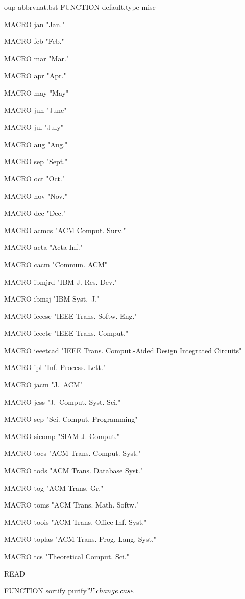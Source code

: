 \begin{filecontents*}[overwrite]{oup-abbrvnat.bst}
FUNCTION {default.type} { misc }


MACRO {jan} {"Jan."}

MACRO {feb} {"Feb."}

MACRO {mar} {"Mar."}

MACRO {apr} {"Apr."}

MACRO {may} {"May"}

MACRO {jun} {"June"}

MACRO {jul} {"July"}

MACRO {aug} {"Aug."}

MACRO {sep} {"Sept."}

MACRO {oct} {"Oct."}

MACRO {nov} {"Nov."}

MACRO {dec} {"Dec."}



MACRO {acmcs} {"ACM Comput. Surv."}

MACRO {acta} {"Acta Inf."}

MACRO {cacm} {"Commun. ACM"}

MACRO {ibmjrd} {"IBM J. Res. Dev."}

MACRO {ibmsj} {"IBM Syst.~J."}

MACRO {ieeese} {"IEEE Trans. Softw. Eng."}

MACRO {ieeetc} {"IEEE Trans. Comput."}

MACRO {ieeetcad}
 {"IEEE Trans. Comput.-Aided Design Integrated Circuits"}

MACRO {ipl} {"Inf. Process. Lett."}

MACRO {jacm} {"J.~ACM"}

MACRO {jcss} {"J.~Comput. Syst. Sci."}

MACRO {scp} {"Sci. Comput. Programming"}

MACRO {sicomp} {"SIAM J. Comput."}

MACRO {tocs} {"ACM Trans. Comput. Syst."}

MACRO {tods} {"ACM Trans. Database Syst."}

MACRO {tog} {"ACM Trans. Gr."}

MACRO {toms} {"ACM Trans. Math. Softw."}

MACRO {toois} {"ACM Trans. Office Inf. Syst."}

MACRO {toplas} {"ACM Trans. Prog. Lang. Syst."}

MACRO {tcs} {"Theoretical Comput. Sci."}


READ

FUNCTION {sortify}
{ purify$
  "l" change.case$
}


\end{filecontents*}
